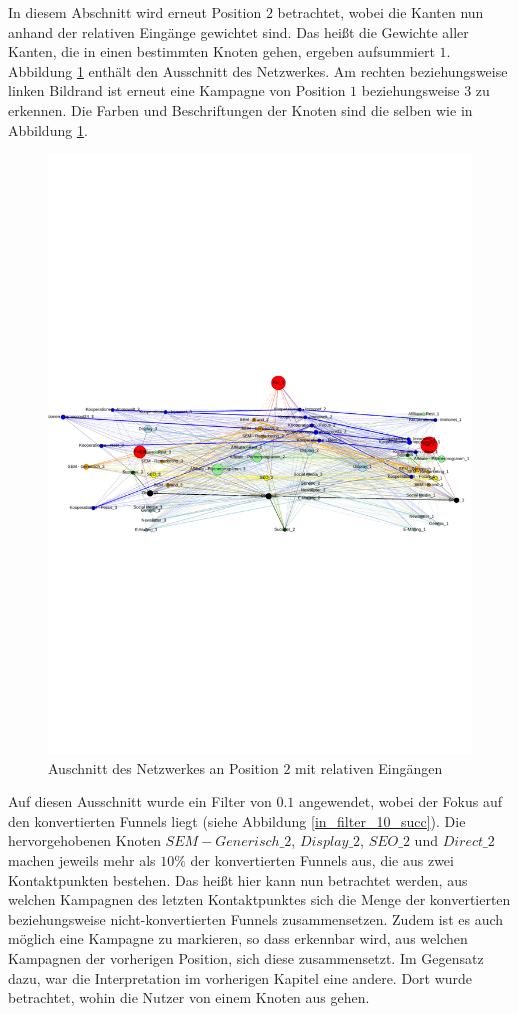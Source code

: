 In diesem Abschnitt wird erneut Position $2$ betrachtet, wobei die Kanten nun anhand der relativen Eingänge gewichtet sind. Das heißt die Gewichte aller Kanten, die in einen bestimmten Knoten gehen, ergeben aufsummiert $1$. Abbildung \ref{in_labels} enthält den Ausschnitt des Netzwerkes. Am rechten beziehungsweise linken Bildrand ist erneut eine Kampagne von Position $1$ beziehungsweise $3$ zu erkennen. Die Farben und Beschriftungen der Knoten sind die selben wie in Abbildung \ref{in_labels}. 
\begin{figure}[H]
	\centering\includegraphics[scale=1]{in_labels.pdf}\caption{Auschnitt des Netzwerkes an Position $2$ mit relativen Eingängen}\label{in_labels}
\end{figure}
Auf diesen Ausschnitt wurde ein Filter von $0.1$ angewendet, wobei der Fokus auf den konvertierten Funnels liegt (siehe Abbildung \ref{in_filter_10_succ}). Die hervorgehobenen Knoten $SEM-Generisch\_2$, $Display\_2$, $SEO\_2$ und $Direct\_2$ machen jeweils mehr als $10 \%$ der konvertierten Funnels aus, die aus zwei Kontaktpunkten bestehen. Das heißt hier kann nun betrachtet werden, aus welchen Kampagnen des letzten Kontaktpunktes sich die Menge der konvertierten beziehungsweise nicht-konvertierten Funnels zusammensetzen. Zudem ist es auch möglich eine Kampagne zu markieren, so dass erkennbar wird, aus welchen Kampagnen der vorherigen Position, sich diese zusammensetzt. Im Gegensatz dazu, war die Interpretation im vorherigen Kapitel eine andere. Dort wurde betrachtet, wohin die Nutzer von einem Knoten aus gehen.
